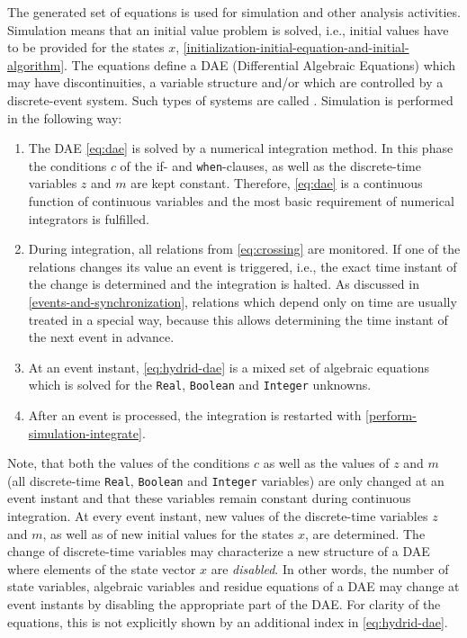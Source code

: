 The generated set of equations is used for simulation and other analysis activities.
Simulation means that an initial value problem is solved, i.e., initial values have to be provided for the states $x$, \cref{initialization-initial-equation-and-initial-algorithm}.
The equations define a DAE (Differential Algebraic Equations) which may have discontinuities, a variable structure and/or which are controlled by a discrete-event system.
Such types of systems are called .
Simulation is performed in the following way:
\begin{enumerate}
\item\label{perform-simulation-integrate}
  The DAE \eqref{eq:dae} is solved by a numerical integration method.
  In this phase the conditions $c$ of the if- and \lstinline!when!-clauses, as well as the discrete-time variables $z$ and $m$ are kept constant.
  Therefore, \eqref{eq:dae} is a continuous function of continuous variables and the most basic requirement of numerical integrators is fulfilled.
\item
  During integration, all relations from \eqref{eq:crossing} are monitored.
  If one of the relations changes its value an event is triggered, i.e., the exact time instant of the change is determined and the integration is halted.
  As discussed in \cref{events-and-synchronization}, relations which depend only on time are usually treated in a special way, because this allows determining the time instant of the next event in advance.
\item
  At an event instant, \eqref{eq:hydrid-dae} is a mixed set of algebraic equations which is solved for the \lstinline!Real!, \lstinline!Boolean! and \lstinline!Integer! unknowns.
\item
  After an event is processed, the integration is restarted with \ref{perform-simulation-integrate}.
\end{enumerate}

Note, that both the values of the conditions $c$ as well as the values of $z$ and $m$ (all discrete-time \lstinline!Real!, \lstinline!Boolean! and \lstinline!Integer! variables) are only changed at an event instant and that these variables remain constant during continuous integration.
At every event instant, new values of the discrete-time variables $z$ and $m$, as well as of new initial values for the states $x$, are determined.
The change of discrete-time variables may characterize a new structure of a DAE where elements of the state vector $x$ are \emph{disabled}.
In other words, the number of state variables, algebraic variables and residue equations of a DAE may change at event instants by disabling the appropriate part of the DAE.
For clarity of the equations, this is not explicitly shown by an additional index in \eqref{eq:hydrid-dae}.

